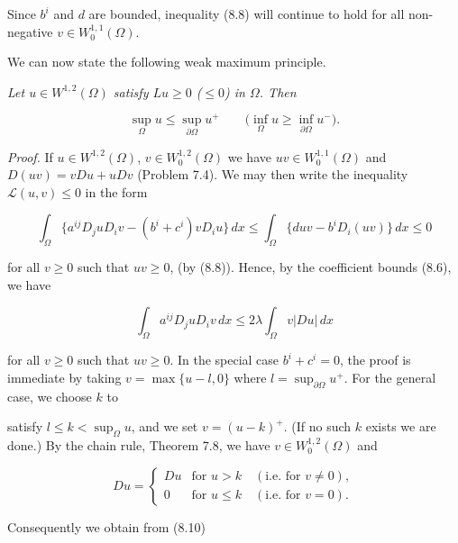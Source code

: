 Since $b^i$ and $d$ are bounded, inequality (8.8) will continue to hold for all non-negative $v \in W_0^{1,1}(\Omega)$.

We can now state the following weak maximum principle.

\begin{theorem}\label{gt-thm-8-1-weak-maximum-principle}
\emph{Let $u \in W^{1,2}(\Omega)$ satisfy $Lu \ge 0$ ($\le 0$) in $\Omega$. Then}

\begin{equation}\tag{8.9}
\sup_{\Omega} u \le \sup_{\partial \Omega} u^{+} \qquad \bigl(\inf_{\Omega} u \ge \inf_{\partial \Omega} u^{-}\bigr).
\end{equation}

\emph{Proof.} If $u \in W^{1,2}(\Omega)$, $v \in W_0^{1,2}(\Omega)$ we have $uv \in W_0^{1,1}(\Omega)$ and $D(uv) = vDu + uDv$ (Problem 7.4). We may then write the inequality $\mathcal{L}(u,v) \le 0$ in the form

\[
\int_{\Omega} \{a^{ij} D_j u D_i v - (b^i + c^i)v D_i u\}\,dx \le \int_{\Omega} \{d u v - b^i D_i(uv)\}\,dx \le 0
\]

for all $v \ge 0$ such that $uv \ge 0$, (by (8.8)). Hence, by the coefficient bounds (8.6), we have

\begin{equation}\tag{8.10}
\int_{\Omega} a^{ij} D_j u D_i v\,dx \le 2\lambda \int_{\Omega} v |Du|\,dx
\end{equation}

for all $v \ge 0$ such that $uv \ge 0$. In the special case $b^i + c^i = 0$, the proof is immediate by taking $v = \max \{u - l, 0\}$ where $l = \sup_{\partial \Omega} u^{+}$. For the general case, we choose $k$ to



satisfy $l \le k < \sup_{\Omega} u$, and we set $v = (u-k)^+$. (If no such $k$ exists we are done.) By the chain rule, Theorem 7.8, we have $v \in W_0^{1,2}(\Omega)$ and

\[
Du =
\begin{cases}
Du & \text{for } u>k \quad (\text{i.e.\ for } v \ne 0),\\
0 & \text{for } u \le k \quad (\text{i.e.\ for } v = 0).
\end{cases}
\]

Consequently we obtain from (8.10)


\end{theorem}
